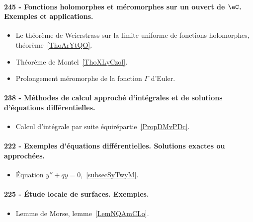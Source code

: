 \paragraph{245 - Fonctions holomorphes et méromorphes sur un ouvert de \( \eC\). Exemples et applications.}
\begin{itemize}
    \item Le théorème de Weierstrass sur la limite uniforme de fonctions holomorphes, théorème~\ref{ThoArYtQO}.
    \item Théorème de Montel~\ref{ThoXLyCzol}.
    \item Prolongement méromorphe de la fonction \( \Gamma\) d'Euler.
\end{itemize}
\paragraph{238 - Méthodes de calcul approché d'intégrales et de solutions d’équations différentielles.}
\begin{itemize}
    \item Calcul d'intégrale par suite équirépartie~\ref{PropDMvPDc}.
\end{itemize}
\paragraph{222 - Exemples d’équations différentielles. Solutions exactes ou approchées.}
\begin{itemize}
    \item Équation \( y''+qy=0\),~\ref{subsecSyTwyM}.
\end{itemize}
\paragraph{225 - Étude locale de surfaces. Exemples.}
\begin{itemize}
    \item Lemme de Morse, lemme~\ref{LemNQAmCLo}.
\end{itemize}
